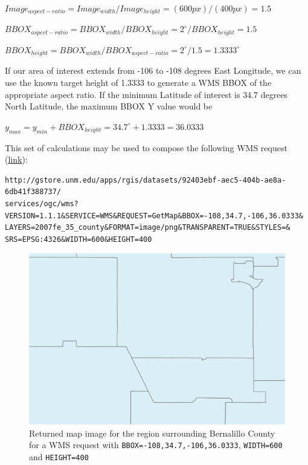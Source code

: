 \documentclass[]{book}
\begin{document}
\(Image_{aspect-ratio} = Image_{width} / Image_{height} = (600px) / (400px) = 1.5\)

\(BBOX_{aspect-ratio} = BBOX_{width} / BBOX_{height} = 2^{\circ} / BBOX_{height} = 1.5\)

\(BBOX_{height} = BBOX_{width} / BBOX_{aspect-ratio} = 2^{\circ} / 1.5 = 1.3333^{\circ}\)

If our area of interest extends from -106 to -108 degrees East
Longitude, we can use the known target height of 1.3333 to generate a
WMS BBOX of the appropriate aspect ratio. If the minimum Latitude of
interest is 34.7 degrees North Latitude, the maximum BBOX Y value would
be

\(y_{max} = y_{min} + BBOX_{height} = 34.7^{\circ} + 1.3333 = 36.0333\)

This set of calculations may be used to compose the following WMS
request
(\href{http://gstore.unm.edu/apps/rgis/datasets/92403ebf-aec5-404b-ae8a-6db41f388737/services/ogc/wms?VERSION=1.1.1\&SERVICE=WMS\&REQUEST=GetMap\&BBOX=-108,34.7,-106,36.0333\&LAYERS=g_2007fe_35_county\&FORMAT=image/png\&TRANSPARENT=TRUE\&STYLES=\&SRS=EPSG:4326\&WIDTH=600\&HEIGHT=400}{link}):

\begin{verbatim}
http://gstore.unm.edu/apps/rgis/datasets/92403ebf-aec5-404b-ae8a-6db41f388737/
services/ogc/wms?VERSION=1.1.1&SERVICE=WMS&REQUEST=GetMap&BBOX=-108,34.7,-106,36.0333&
LAYERS=2007fe_35_county&FORMAT=image/png&TRANSPARENT=TRUE&STYLES=&
SRS=EPSG:4326&WIDTH=600&HEIGHT=400
\end{verbatim}

\begin{figure}[htbp]
\centering
\includegraphics{images/bernalillo_03.png}
\caption{Returned map image for the region surrounding Bernalillo County
for a WMS request with \texttt{BBOX=-108,34.7,-106,36.0333},
\texttt{WIDTH=600} and \texttt{HEIGHT=400}}
\end{figure}
\end{document}
